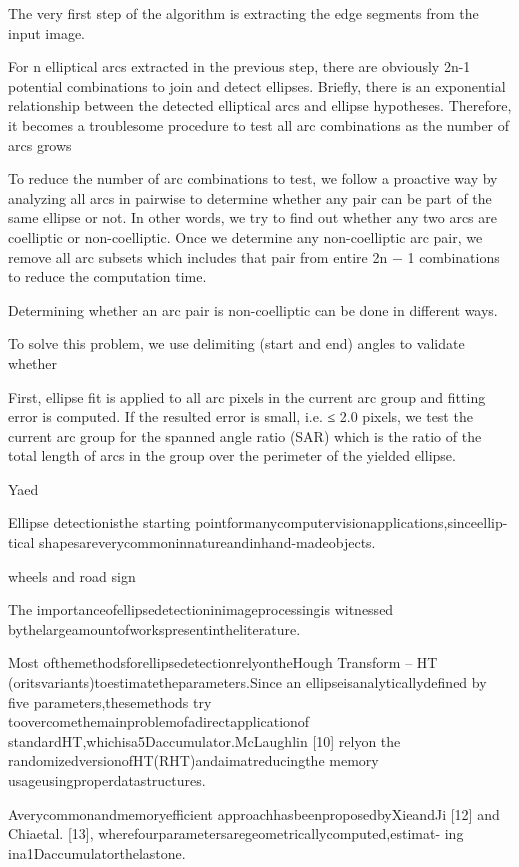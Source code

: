\documentclass[a4paper]{report}
\begin{document}
The very first step of the algorithm is extracting the edge segments from the
input image.

For n elliptical arcs extracted in the previous step, there are obviously 2n-1
potential combinations to join and detect ellipses.
Briefly, there is an exponential relationship between the detected elliptical
arcs and ellipse hypotheses. Therefore, it becomes a troublesome procedure to
test all arc combinations as the number of arcs grows

To reduce the number of arc combinations to test, we follow a proactive
way by analyzing all arcs in pairwise to determine whether any pair can be
part of the same ellipse or not. In other words, we try to find out whether any
two arcs are coelliptic or non-coelliptic. Once we determine any non-coelliptic
arc pair, we remove all arc subsets which includes that pair from entire 2n −
1 combinations to reduce the computation time.

Determining whether an arc
pair is non-coelliptic can be done in different ways.

To solve this problem, we use delimiting (start and
end) angles to validate whether

First, ellipse fit is applied to all arc pixels
in the current arc group and fitting error is computed. If the resulted error is
small, i.e. ≤ 2.0 pixels, we test the current arc group for the spanned angle ratio
(SAR) which is the ratio of the total length of arcs in the group over the perimeter
of the yielded ellipse.


Yaed

Ellipse detectionisthe
starting pointformanycomputervisionapplications,sinceellip-
tical shapesareverycommoninnatureandinhand-madeobjects.

wheels and road sign

The importanceofellipsedetectioninimageprocessingis
witnessed bythelargeamountofworkspresentintheliterature.

Most ofthemethodsforellipsedetectionrelyontheHough
Transform – HT (oritsvariants)toestimatetheparameters.Since
an ellipseisanalyticallydefined by five parameters,thesemethods
try toovercomethemainproblemofadirectapplicationof
standardHT,whichisa5Daccumulator.McLaughlin [10] relyon
the randomizedversionofHT(RHT)andaimatreducingthe
memory usageusingproperdatastructures.

Averycommonandmemoryefficient
approachhasbeenproposedbyXieandJi [12] and Chiaetal.
[13], wherefourparametersaregeometricallycomputed,estimat-
ing ina1Daccumulatorthelastone.
\end{document}
